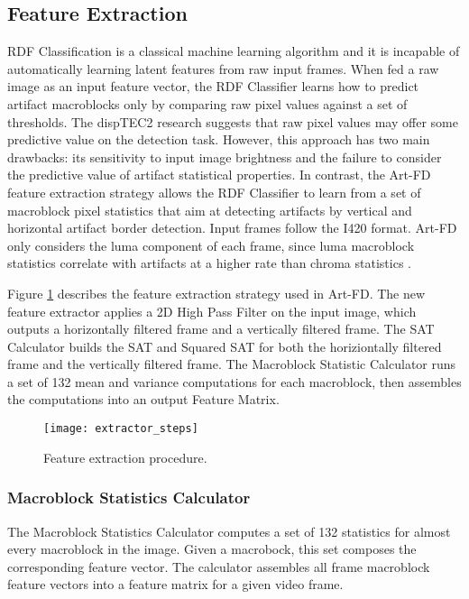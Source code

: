 \subsection{Feature Extraction}
\label{sec:sol_features}

RDF Classification is a classical machine learning algorithm and it is incapable of automatically learning latent features from raw input frames. When fed a raw image as an input feature vector, the RDF Classifier learns how to predict artifact macroblocks only by comparing raw pixel values against a set of thresholds. The dispTEC2 research suggests that raw pixel values may offer some predictive value on the detection task. However, this approach has two main drawbacks: its sensitivity to input image brightness and the failure to consider the predictive value of artifact statistical properties. In contrast, the Art-FD feature extraction strategy allows the RDF Classifier to learn from a set of macroblock pixel statistics that aim at detecting artifacts by vertical and horizontal artifact border detection. Input frames follow the I420 format. Art-FD only considers the luma component of each frame, since luma macroblock statistics correlate with artifacts at a higher rate than chroma statistics \cite{Glavota2016}.

Figure \ref{fig:extractor_steps} describes the feature extraction strategy used in Art-FD. The new feature extractor applies a 2D High Pass Filter on the input image, which outputs a horizontally filtered frame and a vertically filtered frame. The SAT Calculator builds the SAT and Squared SAT for both the horiziontally filtered frame and the vertically filtered frame. The Macroblock Statistic Calculator runs a set of 132 mean and variance computations for each macroblock, then assembles the computations into an output Feature Matrix.

\begin{figure} [!h]
  \centering
  
  \texttt{[image: extractor\_steps]}
  
  \caption{Feature extraction procedure. }
  \label{fig:extractor_steps}

\end{figure}

\subsubsection{Macroblock Statistics Calculator}
\label{sec:sol_stats}

The Macroblock Statistics Calculator computes a set of 132 statistics for almost every macroblock in the image. Given a macrobock, this set composes the corresponding feature vector. The calculator assembles all frame macroblock feature vectors into a feature matrix for a given video frame.

